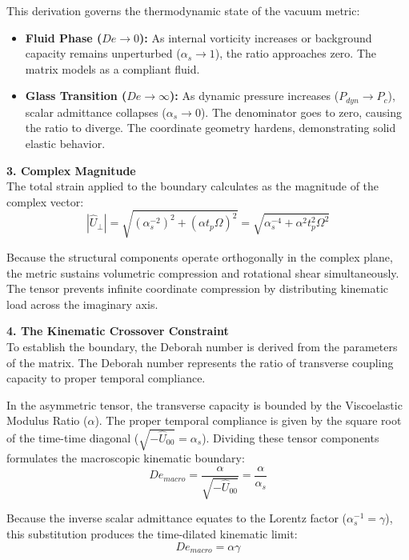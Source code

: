 This derivation governs the thermodynamic state of the vacuum metric:
\begin{itemize}
    \item \textbf{Fluid Phase ($De \to 0$):} As internal vorticity increases or background capacity remains unperturbed ($\alpha_s \to 1$), the ratio approaches zero. The matrix models as a compliant fluid.
    \item \textbf{Glass Transition ($De \to \infty$):} As dynamic pressure increases ($P_{dyn} \to P_c$), scalar admittance collapses ($\alpha_s \to 0$). The denominator goes to zero, causing the ratio to diverge. The coordinate geometry hardens, demonstrating solid elastic behavior.
\end{itemize}

\textbf{3. Complex Magnitude} \\
The total strain applied to the boundary calculates as the magnitude of the complex vector:
\begin{equation}
    |\hat{U}_{\perp}| = \sqrt{(\alpha_s^{-2})^2 + (\alpha t_p \Omega)^2} = \sqrt{\alpha_s^{-4} + \alpha^2 t_p^2 \Omega^2}
\end{equation}

Because the structural components operate orthogonally in the complex plane, the metric sustains volumetric compression and rotational shear simultaneously. The tensor prevents infinite coordinate compression by distributing kinematic load across the imaginary axis.

\textbf{4. The Kinematic Crossover Constraint} \\ 
To establish the boundary, the Deborah number is derived from the parameters of the matrix. The Deborah number represents the ratio of transverse coupling capacity to proper temporal compliance. 

In the asymmetric tensor, the transverse capacity is bounded by the Viscoelastic Modulus Ratio ($\alpha$). The proper temporal compliance is given by the square root of the time-time diagonal ($\sqrt{-\hat{U}_{00}} = \alpha_s$). Dividing these tensor components formulates the macroscopic kinematic boundary: 
\begin{equation}
    De_{macro} = \frac{\alpha}{\sqrt{-\hat{U}_{00}}} = \frac{\alpha}{\alpha_s}
\end{equation}

Because the inverse scalar admittance equates to the Lorentz factor ($\alpha_s^{-1} = \gamma$), this substitution produces the time-dilated kinematic limit: 
\begin{equation}
    De_{macro} = \alpha \gamma
\end{equation}


